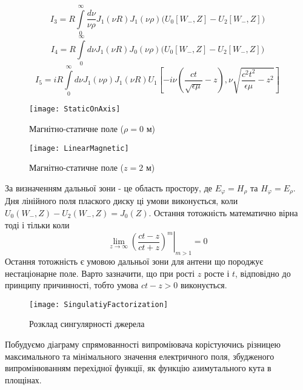%
\begin{equation*}
I_3 = R \int \limits_{0}^{\infty}
\frac{d\nu}{\nu \rho} J_1(\nu R) J_1(\nu \rho)
\Big( U_0[ W_-, Z ] - U_2[ W_-, Z ] \Big) 
\end{equation*}
%
\begin{equation*}
I_4 = R \int \limits_{0}^{\infty} d\nu J_1(\nu R) J_0(\nu \rho)
\Big( U_0[ W_-, Z ] - U_2[ W_-, Z ] \Big) 
\end{equation*}
%
\begin{equation*}
I_5 = i R \int \limits_0^\infty 
d \nu J_1(\nu \rho) J_1 (\nu R)
U_1 \left[ -i \nu \left( \frac{ct}{\sqrt{\epsilon \mu}} - z \right), 
\nu \sqrt{\frac{c^2t^2}{\epsilon \mu}-z^2} \right]
\end{equation*}
%
\begin{figure}[h] \begin{center}
\texttt{[image: StaticOnAxis]}
\caption{Магнітно-статичне поле ($ \rho = 0 $ м)} \label{fig:emp_h_rho}
\end{center} \end{figure}
%
\begin{figure}[h] \begin{center}
\texttt{[image: LinearMagnetic]}
\caption{Магнітно-статичне поле ($ z = 2 $ м)} \label{fig:emp_h_rho}
\end{center} \end{figure}

За визначенням дальньої зони - це область простору, де $ E_\varphi = H_\rho $ та
$ H_\varphi = E_\rho $. Дня лінійного поля плаского диску ці умови виконується, 
коли $ U_0(W_-,Z) - U_2(W_-,Z) = J_0(Z) $. Остання тотожність математично вірна
тоді і тільки коли 
%
\begin{equation} \label{eq:FraunhoferDistance}
\left. \lim_{z \to \infty} \left( \frac{ct-z}{ct+z} \right)^m 
\right|_{m > 1} = 0
\end{equation}
%
Остання тотожність є умовою дальньої зони для антени що породжує 
нестаціонарне поле. Варто зазначити, що при рості $ z $ росте і $ t $, 
відповідно до принципу причинності, тобто умова $ ct - z > 0 $ виконується.
%
\begin{figure}[h] \begin{center}
\texttt{[image: SingulatiyFactorization]}
\caption{Розклад сингулярності джерела} \label{fig:singulatiy_factorization}
\end{center} \end{figure}
%

Побудуємо діаграму спрямованності випроміювача корістуючись різницею 
максимального та мінімального значення електричного поля, збудженого 
випромінюванням перехідної функції, як функцію азимутального кута в площінах. 


